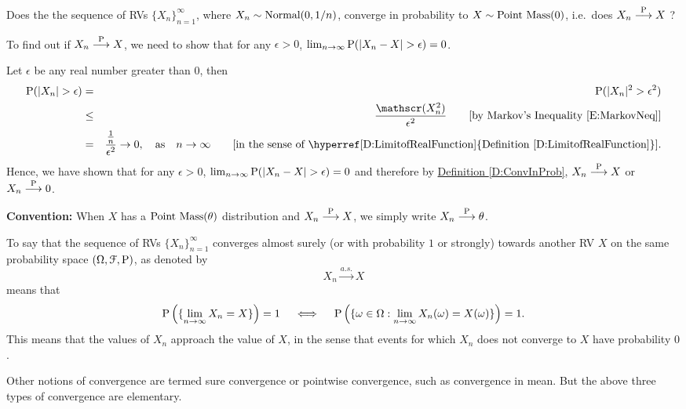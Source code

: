 \begin{example}\label{EX:Normal01bynConvinProbToPointMass0}
Does the the sequence of RVs $\{X_n\}_{n=1}^{\infty}$, where $X_n \sim \normal(0,1/n)$, converge in probability to $X \sim \pointmass(0)$, i.e.~does $X_n \overset{\P}{\longrightarrow} X$ ?

To find out if $X_n \overset{\P}{\longrightarrow} X$, we need to show that for any $\epsilon >0$, $\lim_{n \to \infty} \P(|X_n-X|>\epsilon)=0$.

Let $\epsilon$ be any real number greater than $0$, then
\begin{eqnarray}
\P(|X_n|>\epsilon) &=& \P(|X_n|^2 > \epsilon^2) \notag \\
&\leq& \frac{\E(X_n^2)}{\epsilon^2} \qquad \text{[by Markov's Inequality \eqref{E:MarkovNeq}]} \notag \\
&=& \frac{\frac{1}{n}}{\epsilon^2} \to 0, \quad \text{as} \quad n \to \infty \qquad \text{[in the sense of \hyperref[D:LimitofRealFunction]{Definition \ref*{D:LimitofRealFunction}}].} \notag
\end{eqnarray}
Hence, we have shown that for any $\epsilon >0$, $\lim_{n \to \infty} \P(|X_n-X|>\epsilon)=0$ and therefore by \hyperref[D:ConvInProb]{Definition \ref*{D:ConvInProb}}, $X_n \overset{\P}{\longrightarrow} X$ or $X_n \overset{\P}{\longrightarrow} 0$.  

{\normalsize
{\bf Convention:} When $X$ has a $\pointmass(\theta)$ distribution and $X_n \overset{\P}{\longrightarrow} X$, we simply write $X_n \overset{\P}{\longrightarrow} \theta$.
}
\end{example}

\begin{definition}
To say that the sequence of RVs $\{X_n\}_{n=1}^{\infty}$ converges almost surely (or with probability $1$ or strongly) towards another RV $X$ on the same probability space $(\Omega,\mathcal{F},\P)$, as denoted by
\[
X_n \overset{a.s.}{\to} X
\]
means that
\[
\P \left( \{ \lim_{n \to \infty} X_n = X \} \right) = 1 \quad \iff \quad \P \left( \{\omega \in \Omega : \lim_{n \to \infty} X_n(\omega) = X(\omega)\} \right) = 1.
\]
This means that the values of $X_n$ approach the value of $X$, in the sense that events for which $X_n$ does not converge to $X$ have probability $0$.
\end{definition}

Other notions of convergence are termed sure convergence or pointwise convergence, such as convergence in mean. 
But the above three types of convergence are elementary. %

